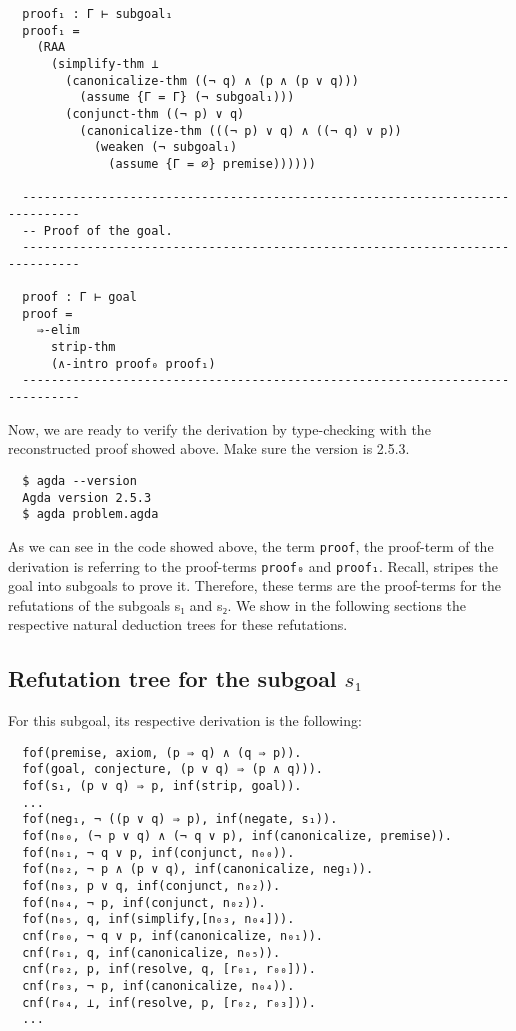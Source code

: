 \documentclass[../main.tex]{subfiles}
\begin{document}
\begin{subappendices}
\begin{verbatim}
  proof₁ : Γ ⊢ subgoal₁
  proof₁ =
    (RAA
      (simplify-thm ⊥
        (canonicalize-thm ((¬ q) ∧ (p ∧ (p ∨ q)))
          (assume {Γ = Γ} (¬ subgoal₁)))
        (conjunct-thm ((¬ p) ∨ q)
          (canonicalize-thm (((¬ p) ∨ q) ∧ ((¬ q) ∨ p))
            (weaken (¬ subgoal₁)
              (assume {Γ = ∅} premise))))))

  ------------------------------------------------------------------------------
  -- Proof of the goal.
  ------------------------------------------------------------------------------

  proof : Γ ⊢ goal
  proof =
    ⇒-elim
      strip-thm
      (∧-intro proof₀ proof₁)
  ------------------------------------------------------------------------------
  \end{verbatim}

Now, we are ready to verify the \Metis derivation by type-checking with
\Agda the reconstructed proof showed above. Make sure the \Agda version is
 2.5.3.

\begin{verbatim}
  $ agda --version
  Agda version 2.5.3
  $ agda problem.agda
\end{verbatim}

As we can see in the \Agda code showed above, the term \verb!proof!, the proof-term
of the \Metis derivation is referring to the proof-terms \verb!proof₀! and \verb!proof₁!.
Recall, \Metis stripes the goal into subgoals to prove it. Therefore, these
terms are the proof-terms for the refutations of the subgoals s₁ and s₂.
We show in the following sections the respective natural deduction trees for these
refutations.

\subsection{Refutation tree for the subgoal $s₁$}
For this subgoal, its respective \TSTP derivation is
the following:

\begin{verbatim}
  fof(premise, axiom, (p ⇒ q) ∧ (q ⇒ p)).
  fof(goal, conjecture, (p ∨ q) ⇒ (p ∧ q))).
  fof(s₁, (p ∨ q) ⇒ p, inf(strip, goal)).
  ...
  fof(neg₁, ¬ ((p ∨ q) ⇒ p), inf(negate, s₁)).
  fof(n₀₀, (¬ p ∨ q) ∧ (¬ q ∨ p), inf(canonicalize, premise)).
  fof(n₀₁, ¬ q ∨ p, inf(conjunct, n₀₀)).
  fof(n₀₂, ¬ p ∧ (p ∨ q), inf(canonicalize, neg₁)).
  fof(n₀₃, p ∨ q, inf(conjunct, n₀₂)).
  fof(n₀₄, ¬ p, inf(conjunct, n₀₂)).
  fof(n₀₅, q, inf(simplify,[n₀₃, n₀₄])).
  cnf(r₀₀, ¬ q ∨ p, inf(canonicalize, n₀₁)).
  cnf(r₀₁, q, inf(canonicalize, n₀₅)).
  cnf(r₀₂, p, inf(resolve, q, [r₀₁, r₀₀])).
  cnf(r₀₃, ¬ p, inf(canonicalize, n₀₄)).
  cnf(r₀₄, ⊥, inf(resolve, p, [r₀₂, r₀₃])).
  ...
\end{verbatim}


\end{subappendices}
\end{document}
